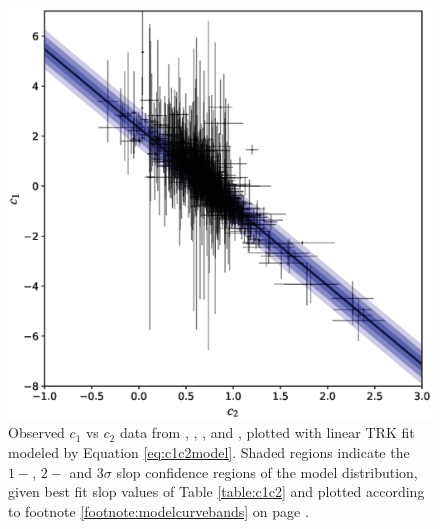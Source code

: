 \begin{figure}
    \centering
    \includegraphics[width=1.0\linewidth]{figures/c1c2_data.eps}
    \caption{Observed $c_1$ vs $c_2$ data from \textcite{valencic04}, \textcite{gordon03}, \textcite{newdatafitzpatrick2007analysis}, and \textcite{m31dataclayton2015new}, plotted with linear TRK fit modeled by Equation \eqref{eq:c1c2model}. Shaded regions indicate the $1-$, $2-$ and $3\sigma$ slop confidence regions of the model distribution, given best fit slop values of Table \ref{table:c1c2} and plotted according to footnote \ref{footnote:modelcurvebands} on page \pageref{footnote:modelcurvebands}.}
    \label{fig:c1c2_data}
\end{figure}

